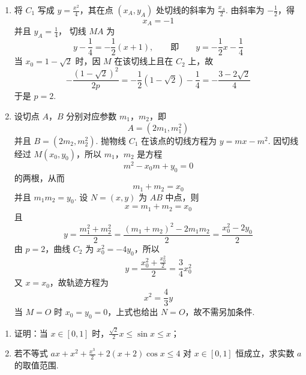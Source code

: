\begin{solution}
\begin{enumerate}
\item 将 \(C_1\) 写成 \(y=\frac{x^2}{4}\)，其在点 \((x_A,y_A)\) 处切线的斜率为
\(\frac{x_A}{2}\). 由斜率为 \(-\frac{1}{2}\)，得
\[
x_A=-1
\]
并且 \(y_A=\frac14\)，
切线 \(MA\) 为
\[
y-\frac14=-\frac12(x+1),
\qquad\text{即}\qquad y=-\frac12x-\frac14
\]
当 \(x_0=1-\sqrt2\) 时，因 \(M\) 在该切线上且在 \(C_2\) 上，故
\[
-\frac{(1-\sqrt2)^2}{2p}
 =-\frac12(1-\sqrt2)-\frac14
 =-\frac{3-2\sqrt2}{4}
\]
于是 \(p=2\).

\item 设切点 \(A\)，\(B\) 分别对应参数 \(m_1\)，\(m_2\)，即
\[
A=(2m_1,m_1^2)
\]
并且 \(B=(2m_2,m_2^2)\).
抛物线 \(C_1\) 在该点的切线方程为 \(y=mx-m^2\). 因切线经过
\(M(x_0,y_0)\)，所以 \(m_1\)，\(m_2\) 是方程
\[
m^2-x_0m+y_0=0
\]
的两根，从而
\[
m_1+m_2=x_0
\]
并且 \(m_1m_2=y_0\).
设 \(N=(x,y)\) 为 \(AB\) 中点，则
\[
x=m_1+m_2=x_0
\]
且
\[
y=\frac{m_1^2+m_2^2}{2}
 =\frac{(m_1+m_2)^2-2m_1m_2}{2}
 =\frac{x_0^2-2y_0}{2}
\]
由 \(p=2\)，曲线 \(C_2\) 为 \(x_0^2=-4y_0\)，所以
\[
y=\frac{x_0^2+\frac{x_0^2}{2}}{2}=\frac34x_0^2
\]
又 \(x=x_0\)，故轨迹方程为
\[
x^2=\frac43y
\]
当 \(M=O\) 时 \(x_0=y_0=0\)，上式也给出 \(N=O\)，故不需另加条件.
\end{enumerate}
\end{solution}

\begin{problem}
\begin{enumerate}
\item 证明：当 \(x \in [0,1]\) 时，\(\frac{\sqrt{2}}{2}x \leqslant \sin x \leqslant x\)；
\item 若不等式 \(ax + x^2 + \frac{x^3}{2} + 2(x + 2)\cos x \leqslant 4\) 对 \(x \in [0,1]\) 恒成立，求实数 \(a\) 的取值范围.
\end{enumerate}
\end{problem}

